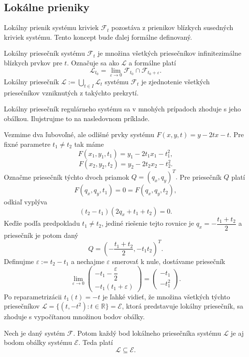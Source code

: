 \subsection{Lokálne prieniky} \label{lokalne prieniky pre krivky}
Lokálny prienik systému kriviek $\mathcal{F}_t $ pozostáva z prienikov blízkych susedných kriviek systému. Tento koncept bude ďalej formálne definovaný.
\begin{definition}
Lokálny priesečník systému $\mathcal{F}_t$ je množina všetkých priesečníkov infinitezimálne blízkych prvkov pre $t$. Označuje sa ako $\mathcal{L}$ a formálne platí
$$
\mathcal{L}_{t_0} = \lim_{\varepsilon \to 0} \mathcal{F}_{t_0} \cap \mathcal{F}_{t_0 + \varepsilon}.
$$
Lokálny priesečník $\mathcal{L} := \bigcup_{t \in I} \mathcal{L}_{t}$ systému $\mathcal{F}_t $ je zjednotenie všetkých priesečníkov vzniknutých z takýchto prekrytí.
\end{definition}
Lokálny priesečník regulárneho systému sa v mnohých prípadoch zhoduje s jeho obálkou. Ilujstrujme to na nasledovnom príklade.

\begin{example}
Vezmime dva ľubovoľné, ale odlišné prvky systému $F(x, y, t) = y - 2tx - t.$
Pre fixné parametre $t_1 \neq t_2$ tak máme
$$F(x_1, y_1, t_1) = y_1 - 2t_1x_1 - t_1^2,$$
$$F(x_2, y_2, t_2) = y_2 - 2t_2x_2 - t_2^2.$$ 
Označme priesečník týchto dvoch priamok $Q = (q_x, q_y)^T.$ Pre priesečník $Q$ platí $$F(q_x, q_y, t_1) = 0 = F(q_x, q_y, t_2),$$ odkiaľ vyplýva 
$$(t_2 - t_1)(2q_x + t_1 + t_2) = 0.$$ 
Keďže podľa predpokladu $t_1 \neq t_2$, jediné riešenie tejto rovnice je $q_x = -\dfrac{t_1 + t_2}{2}$ a priesečník je potom daný 
$$Q = (-\dfrac{t_1 + t_2}{2}, -t_1t_2)^T.$$ Definujme $\varepsilon := t_2 - t_1$ a nechajme $\varepsilon$ smerovať k nule, dostávame priesečník
$$
\lim_{\varepsilon \to 0} 
\begin{pmatrix} 
-t_1 - \dfrac{\varepsilon}{2} \\
-t_1(t_1 + \varepsilon)
\end{pmatrix} = \begin{pmatrix} 
-t_1 \\
-t_1^2
\end{pmatrix}.
$$
Po reparametrizácii $t_1(t) = -t$ je ľahké vidieť, že množina všetkých týchto priesečníkov $\mathcal{L} = \{(t, -t^2): t \in \mathbb{R}\} = \mathcal{E}$, ktorá predstavuje lokálny priesečník, sa zhoduje s vypočítanou množinou bodov obálky.
\end{example}

\begin{corollary} Nech je daný systém $\mathcal{F}$. Potom každý bod lokálneho priesečníka systému $\mathcal{L}$ je aj bodom obálky systému $\mathcal{E}$. Teda platí
$$ \mathcal{L} \subseteq \mathcal{E}. $$
\end{corollary}

